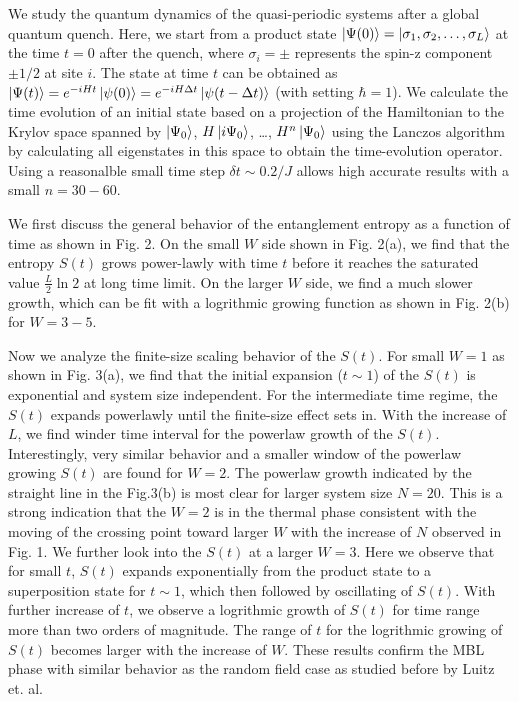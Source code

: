 \documentclass[prl,aps,epsf,showpacs,twocolumn,letterpaper]{revtex4}
\begin{document}
We study the quantum dynamics of the quasi-periodic systems after a global
quantum quench.  Here,  we start from a product state
$\ket{\Psi(0)}=\ket{\sigma_1, \sigma_2, \ldots , \sigma_L}$  at the time $t=0$
after the quench, where $\sigma_i=\pm$ represents  the spin-z component $\pm
1/2$ at site $i$.  The state at time $t$ can be obtained as $\ket{\Psi(t)} =
e^{-iHt}\ket{\psi(0)}=e^{-iH\Delta t}\ket{\psi(t-\Delta t)}$ (with setting $\hbar=1$).
We calculate the time evolution of an initial  state  based on  a projection of
the Hamiltonian to the Krylov space spanned by
$\ket{\Psi_0}$, $H\ket{i\Psi_0}$, \ldots, $H^n\ket{\Psi_0}$  using the Lanczos
algorithm by calculating all eigenstates in this space to obtain the
time-evolution operator\cite{luitz2015}.  Using a reasonalble small time step
$\delta t \sim 0.2/J$ allows high accurate results with a small $n=30-60$.


We first discuss the general behavior of the  entanglement entropy as a function
of time as shown in Fig. 2.  On the small $W$ side shown in Fig. 2(a),  we find
that the entropy $S(t)$ grows power-lawly with time $t$ before it reaches the
saturated value $\frac L 2 \ln2$ at long time limit.  On the larger  $W$ side,
we find a much slower growth, which can be fit with a logrithmic growing
function as shown in Fig. 2(b) for $W=3-5$.  


Now we analyze the finite-size scaling behavior of the $S(t)$.  For small $W=1$
as shown in Fig. 3(a),  we find that the initial expansion ($t\sim 1$) of the
$S(t)$ is exponential and system size independent.  For the intermediate time
regime,  the $S(t)$ expands powerlawly until the finite-size effect sets in.
With the increase of $L$,  we find winder time interval for the powerlaw growth
of  the $S(t)$.  Interestingly,  very similar behavior and a smaller window of
the powerlaw growing $S(t)$ are found for $W=2$.  The powerlaw growth indicated
by the straight line in the Fig.3(b) is most clear for larger system size
$N=20$.  This is a strong indication that the $W=2$  is in the thermal phase
consistent with the moving of the crossing point toward larger $W$ with the
increase of $N$ observed in Fig. 1.  We further look into the $S(t)$  at  a
larger $W=3$.  Here we observe that for  small $t$,  $S(t)$ expands
exponentially from the product state to a superposition state for $t\sim 1$,
which then followed by oscillating of $S(t)$.  With further increase of $t$,  we
observe a logrithmic growth of $S(t)$ for time range more than two orders of
magnitude.  The range of $t$ for the logrithmic growing  of $S(t)$ becomes
larger with the increase of $W$.   These results confirm the MBL phase with
similar behavior as the random field case as studied before by Luitz et.
al\cite{luitz2015}. 
\end{document}
